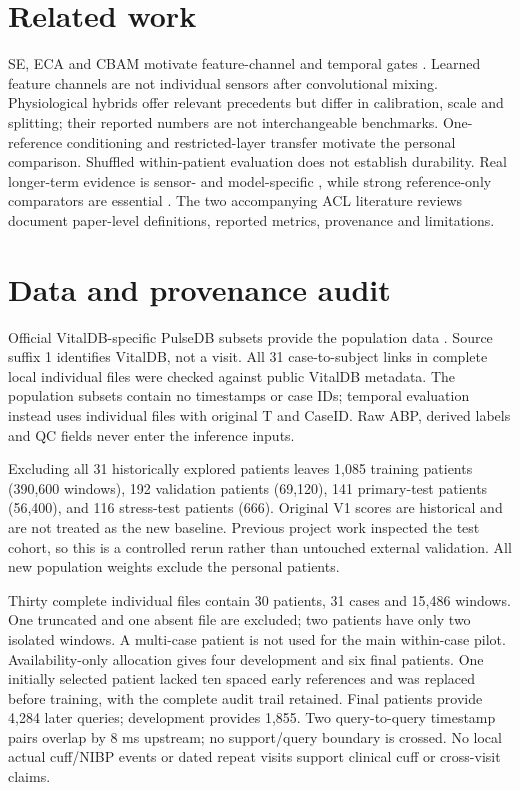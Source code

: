 \documentclass[11pt]{article}
\begin{document}
\section{Related work}
SE, ECA and CBAM motivate feature-channel and temporal gates
\citep{hu2018se,wang2020eca,woo2018cbam}. Learned feature channels are not
individual sensors after convolutional mixing. Physiological hybrids offer
relevant precedents but differ in calibration, scale and splitting; their
reported numbers are not interchangeable benchmarks. One-reference conditioning
\citep{schlesinger2020} and restricted-layer transfer \citep{leitner2022} motivate
the personal comparison. Shuffled within-patient evaluation does not establish
durability. Real longer-term evidence is sensor- and model-specific
\citep{yavarimanesh2022}, while strong reference-only comparators are essential
\citep{mieloszyk2022}. The two accompanying ACL literature reviews document
paper-level definitions, reported metrics, provenance and limitations.

\section{Data and provenance audit}
Official VitalDB-specific PulseDB subsets provide the population data
\citep{wang2023pulsedb}. Source suffix 1 identifies VitalDB, not a visit. All 31
case-to-subject links in complete local individual files were checked against
public VitalDB metadata. The population subsets contain no timestamps or case
IDs; temporal evaluation instead uses individual files with original T and
CaseID. Raw ABP, derived labels and QC fields never enter the inference inputs.

Excluding all 31 historically explored patients leaves 1,085 training patients
(390,600 windows), 192 validation patients (69,120), 141 primary-test patients
(56,400), and 116 stress-test patients (666). Original V1 scores are historical
and are not treated as the new baseline. Previous project work inspected the
test cohort, so this is a controlled rerun rather than untouched external
validation. All new population weights exclude the personal patients.

Thirty complete individual files contain 30 patients, 31 cases and 15,486
windows. One truncated and one absent file are excluded; two patients have
only two isolated windows. A multi-case patient is not used for the main
within-case pilot. Availability-only allocation gives four development and
six final patients. One initially selected patient lacked ten spaced early
references and was replaced before training, with the complete audit trail
retained. Final patients provide 4,284 later queries; development provides 1,855.
Two query-to-query timestamp pairs overlap by 8 ms upstream; no support/query
boundary is crossed. No local actual cuff/NIBP events or dated repeat visits
support clinical cuff or cross-visit claims.
\end{document}
